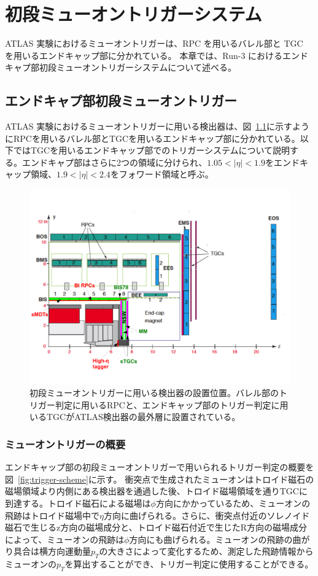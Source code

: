 \chapter{初段ミューオントリガーシステム}\label{chapter3}
ATLAS 実験におけるミューオントリガーは、RPC を用いるバレル部と TGC を用いるエンドキャップ部に分かれている。
本章では、Run-3 におけるエンドキャプ部初段ミューオントリガーシステムについて述べる。

\section{エンドキャプ部初段ミューオントリガー}
ATLAS 実験におけるミューオントリガーに用いる検出器は、図~\ref{fig:muon}に示すようにRPCを用いるバレル部とTGCを用いるエンドキャップ部に分かれている。以下ではTGCを用いるエンドキャップ部でのトリガーシステムについて説明する。エンドキャプ部はさらに2つの領域に分けられ、$1.05 < |\eta| < 1.9$をエンドキャップ領域、$1.9 < |\eta| < 2.4$をフォワード領域と呼ぶ。
\begin{figure}[tb]
  \centering
  \includegraphics[clip, width=14cm]{fig/2/ch01_fig_03a.pdf}
  \caption{初段ミューオントリガーに用いる検出器の設置位置\cite{article:phase2}。バレル部のトリガー判定に用いるRPCと、エンドキャップ部のトリガー判定に用いるTGCがATLAS検出器の最外層に設置されている。}
  \label{fig:muon}
\end{figure}

\subsection{ミューオントリガーの概要}\label{section:CW}
エンドキャップ部の初段ミューオントリガーで用いられるトリガー判定の概要を図~\ref{fig:trigger-scheme}に示す。
衝突点で生成されたミューオンはトロイド磁石の磁場領域より内側にある検出器を通過した後、トロイド磁場領域を通りTGCに到達する。トロイド磁石による磁場は$\phi$方向にかかっているため、ミューオンの飛跡はトロイド磁場中で$\eta$方向に曲げられる。さらに、衝突点付近のソレノイド磁石で生じるz方向の磁場成分と、トロイド磁石付近で生じたR方向の磁場成分によって、ミューオンの飛跡は$\phi$方向にも曲げられる。ミューオンの飛跡の曲がり具合は横方向運動量$p_T$の大きさによって変化するため、測定した飛跡情報からミューオンの$p_T$を算出することができ、トリガー判定に使用することができる。

